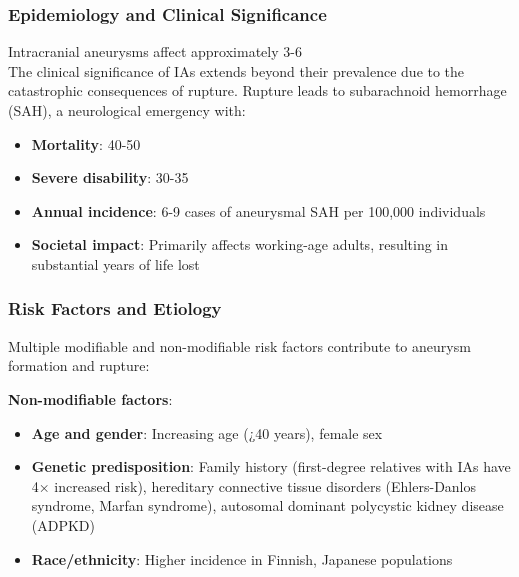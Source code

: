 \documentclass[conference]{IEEEtran}
\begin{document}
\subsubsection{Epidemiology and Clinical Significance}

Intracranial aneurysms affect approximately 3-6\\%

The clinical significance of IAs extends beyond their prevalence due to the catastrophic consequences of rupture. Rupture leads to subarachnoid hemorrhage (SAH), a neurological emergency with:
\begin{itemize}
    \item \textbf{Mortality}: 40-50\\%
    \item \textbf{Severe disability}: 30-35\\%
    \item \textbf{Annual incidence}: 6-9 cases of aneurysmal SAH per 100,000 individuals
    \item \textbf{Societal impact}: Primarily affects working-age adults, resulting in substantial years of life lost
\end{itemize}

\subsubsection{Risk Factors and Etiology}

Multiple modifiable and non-modifiable risk factors contribute to aneurysm formation and rupture:

\textbf{Non-modifiable factors}:
\begin{itemize}
    \item \textbf{Age and gender}: Increasing age (¿40 years), female sex
    \item \textbf{Genetic predisposition}: Family history (first-degree relatives with IAs have 4× increased risk), hereditary connective tissue disorders (Ehlers-Danlos syndrome, Marfan syndrome), autosomal dominant polycystic kidney disease (ADPKD)
    \item \textbf{Race/ethnicity}: Higher incidence in Finnish, Japanese populations
\end{itemize}
\end{document}

